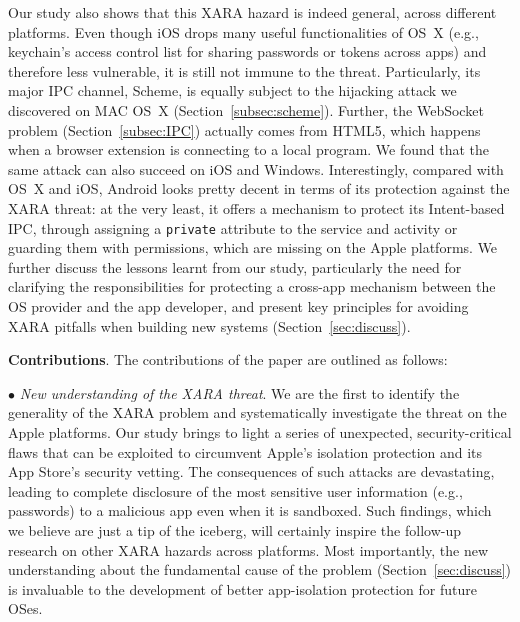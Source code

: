 \documentclass{article}
\newcommand{\ignore}[1]{}
\begin{document}
Our study also shows that this XARA hazard is indeed general, across different platforms. Even though iOS drops many useful functionalities of OS~X (e.g., keychain's access control list for sharing passwords or tokens across apps) and therefore less vulnerable, it is still not immune to the threat.  Particularly, its major IPC channel, Scheme, is equally subject to the hijacking attack we discovered on MAC OS~X (Section~\ref{subsec:scheme}). Further, the WebSocket problem (Section~\ref{subsec:IPC}) actually comes from HTML5, which happens when a browser extension is connecting to a local program.  We found that the same attack can also succeed on iOS and Windows. Interestingly, compared with OS~X and iOS, Android looks pretty decent in terms of its protection against the XARA threat: at the very least, it offers a mechanism to protect its Intent-based IPC, through assigning a \texttt{private} attribute to the service and activity or guarding them with permissions, which are missing on the Apple platforms.\ignore{ On the other hand, subtle XARA problems are still there, even when the app developer makes proper use of the OS protection: for example, we found that a malicious app can use the authority name of its content provider to block the installation of antivirus app \textit{360 Security - Antivirus FREE} (Section~\ref{sec:discuss}).} We further discuss the lessons learnt from our study, particularly the need for clarifying the responsibilities for protecting a cross-app mechanism between the OS provider and the app developer, and present key principles for avoiding XARA pitfalls when building new systems (Section~\ref{sec:discuss}).

\vspace {3pt}\noindent\textbf{Contributions}.  The contributions of the paper are outlined as follows:


\vspace {2pt}\noindent$\bullet$\textit{ New understanding of the XARA threat}.  We are the first to identify the generality of the XARA problem and systematically investigate the threat on the Apple platforms.  Our study brings to light a series of unexpected, security-critical flaws that can be exploited to circumvent Apple's isolation protection and its App Store's security vetting.  The consequences of such attacks are devastating, leading to complete disclosure of the most sensitive user information (e.g., passwords) to a malicious app even when it is sandboxed. Such findings, which we believe are just a tip of the iceberg, will certainly inspire the follow-up research on other XARA hazards across platforms. Most importantly, the new understanding about the fundamental cause of the problem (Section~\ref{sec:discuss}) is invaluable to the development of better app-isolation protection for future OSes.
\end{document}
